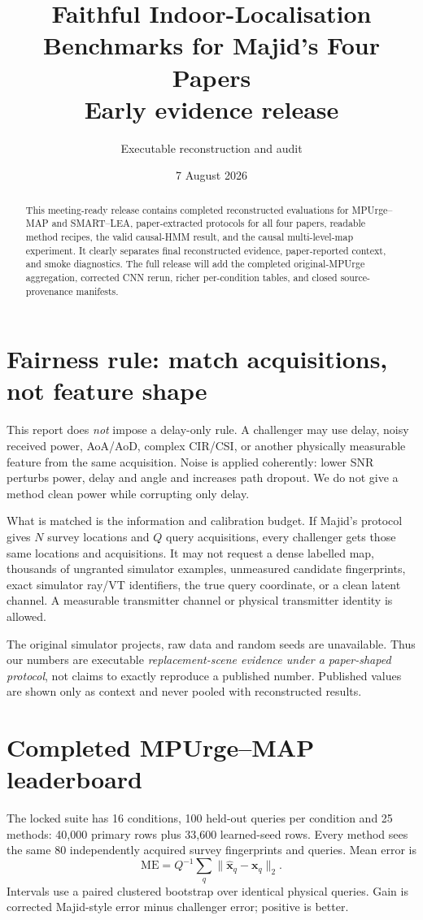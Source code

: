 \documentclass[10pt,a4paper]{article}
\title{Faithful Indoor-Localisation Benchmarks for Majid's Four Papers\\\large Early evidence release}
\author{Executable reconstruction and audit}
\date{7 August 2026}
\begin{document}
\maketitle
\begin{abstract}
This meeting-ready release contains completed reconstructed evaluations for MPUrge--MAP and SMART--LEA, paper-extracted protocols for all four papers, readable method recipes, the valid causal-HMM result, and the causal multi-level-map experiment. It clearly separates final reconstructed evidence, paper-reported context, and smoke diagnostics. The full release will add the completed original-MPUrge aggregation, corrected CNN rerun, richer per-condition tables, and closed source-provenance manifests.
\end{abstract}

\section{Fairness rule: match acquisitions, not feature shape}
This report does \emph{not} impose a delay-only rule. A challenger may use delay, noisy received power, AoA/AoD, complex CIR/CSI, or another physically measurable feature from the same acquisition. Noise is applied coherently: lower SNR perturbs power, delay and angle and increases path dropout. We do not give a method clean power while corrupting only delay.

What is matched is the information and calibration budget. If Majid's protocol gives $N$ survey locations and $Q$ query acquisitions, every challenger gets those same locations and acquisitions. It may not request a dense labelled map, thousands of ungranted simulator examples, unmeasured candidate fingerprints, exact simulator ray/VT identifiers, the true query coordinate, or a clean latent channel. A measurable transmitter channel or physical transmitter identity is allowed.

The original simulator projects, raw data and random seeds are unavailable. Thus our numbers are executable \emph{replacement-scene evidence under a paper-shaped protocol}, not claims to exactly reproduce a published number. Published values are shown only as context and never pooled with reconstructed results.

\section{Completed MPUrge--MAP leaderboard}
The locked suite has 16 conditions, 100 held-out queries per condition and 25 methods: 40,000 primary rows plus 33,600 learned-seed rows. Every method sees the same 80 independently acquired survey fingerprints and queries. Mean error is
\[
 \mathrm{ME}=Q^{-1}\sum_q\lVert\widehat{\mathbf x}_q-\mathbf x_q\rVert_2.
\]
Intervals use a paired clustered bootstrap over identical physical queries. Gain is corrected Majid-style error minus challenger error; positive is better.
\end{document}
